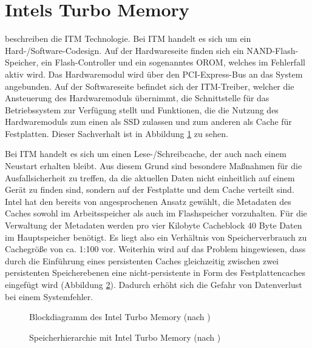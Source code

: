 \section{Intels Turbo Memory}
\label{chap3:itm}

\Textcite{intel:turbo} beschreiben die \ac{ITM} Technologie. Bei \ac{ITM} handelt es sich um ein Hard-/Software-Codesign. Auf der
Hardwareseite finden sich ein NAND-Flash-Speicher, ein Flash-Controller und ein sogenanntes OROM, welches im Fehlerfall aktiv wird. Das Hardwaremodul wird über
den PCI-Express-Bus an das System angebunden. Auf der Softwareseite befindet sich der \ac{ITM}-Treiber, welcher die Ansteuerung des Hardwaremoduls übernimmt, die
Schnittstelle für das Betriebssystem zur Verfügung stellt und Funktionen, die die Nutzung des Hardwaremoduls zum einen als \ac{SSD} zulassen und zum anderen als
Cache für Festplatten. Dieser Sachverhalt ist in Abbildung \ref{chap3:intel1} zu sehen.

Bei \ac{ITM} handelt es sich um einen Lese-/Schreibcache, der auch nach einem Neustart erhalten bleibt. Aus diesem Grund sind besondere Maßnahmen für die
Ausfallsicherheit zu treffen, da die aktuellen Daten nicht einheitlich auf einem Gerät zu finden sind, sondern auf der Festplatte und dem Cache verteilt sind.
Intel hat den bereits von \textcite{dm-cache} angesprochenen Ansatz gewählt, die Metadaten des Caches sowohl im Arbeitsspeicher als auch im Flashspeicher vorzuhalten.
Für die Verwaltung der Metadaten werden pro vier Kilobyte Cacheblock 40 Byte Daten im Hauptspeicher benötigt. Es liegt also ein Verhältnis von Speicherverbrauch
zu Cachegröße von ca. 1:100 vor. Weiterhin wird auf das Problem hingewiesen, dass durch die Einführung eines persistenten Caches gleichzeitig zwischen zwei
persistenten Speicherebenen eine nicht-persistente in Form des Festplattencaches eingefügt wird (Abbildung \ref{chap3:intel2}). Dadurch erhöht sich die Gefahr von
Datenverlust bei einem Systemfehler.

\begin{figure}[t!]\centering
  \caption[Blockdiagramm des Intel Turbo Memory]{Blockdiagramm des Intel Turbo Memory (nach \textcite{intel:turbo})}
  \label{chap3:intel1}
\end{figure}

\begin{figure}[b!]\centering
	\caption[Speicherhierarchie mit Intel Turbo Memory]{Speicherhierarchie mit Intel Turbo Memory (nach \textcite{intel:turbo})}
	\label{chap3:intel2}
\end{figure}

